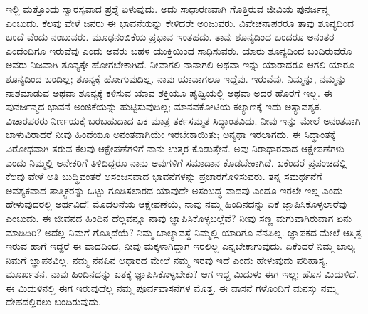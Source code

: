 ಇಲ್ಲಿ ಮತ್ತೊಂದು ಸ್ವಾರಸ್ಯವಾದ ಪ್ರಶ್ನೆ ಏಳುವುದು. ಅದು ಸಾಧಾರಣವಾಗಿ ಗೊತ್ತಿರುವ ಜೀವಿಯ ಪುನರ್ಜನ್ಮ ಎಂಬುದು. ಕೆಲವು ವೇಳೆ ಜನರು ಈ ಭಾವನೆಯನ್ನು ಕೇಳಿದರೇ ಅಂಜುವರು. ವಿವೇಚನಾಪರರೂ ತಾವು ಶೂನ್ಯದಿಂದ ಬಂದೆ ವೆಂದು ನಂಬುವರು. ಮೂಢನಂಬಿಕೆಯ ಪ್ರಭಾವ ಇಂತಹದು. ತಾವು ಶೂನ್ಯದಿಂದ ಬಂದರೂ ಅನಂತರ ಎಂದೆಂದಿಗೂ ಇರುವೆವು ಎಂದು ಅವರು ಬಹಳ ಯುಕ್ತಿಯಿಂದ ಸಾಧಿಸುವರು. ಯಾರು ಶೂನ್ಯದಿಂದ ಬಂದಿರುವರೊ ಅವರು ನಿಜವಾಗಿ ಶೂನ್ಯಕ್ಕೇ ಹೋಗಬೇಕಾಗಿದೆ. ನೀವಾಗಲಿ ನಾನಾಗಲಿ ಅಥವಾ ಇನ್ನು ಯಾರಾದರೂ ಆಗಲಿ ಯಾರೂ ಶೂನ್ಯದಿಂದ ಬಂದಿಲ್ಲ; ಶೂನ್ಯಕ್ಕೆ ಹೋಗುವುದಿಲ್ಲ. ನಾವು ಯಾವಾಗಲೂ ಇದ್ದೆವು. ಇರುವೆವು. ನಿಮ್ಮನ್ನು, ನಮ್ಮನ್ನು ನಾಶಮಾಡುವ ಅಥವಾ ಶೂನ್ಯಕ್ಕೆ ಕಳಿಸುವ ಯಾವ ಶಕ್ತಿಯೂ ಪೃಥ್ವಿಯಲ್ಲಿ ಅಥವಾ ಅದರ ಹೊರಗೆ ಇಲ್ಲ. ಈ ಪುನರ್ಜನ್ಮದ ಭಾವನೆ ಅಂಜಿಕೆಯನ್ನು ಹುಟ್ಟಿಸುವುದಿಲ್ಲ; ಮಾನವಕೋಟಿಯ ಕಲ್ಯಾಣಕ್ಕೆ ಇದು ಅತ್ಯಾವಶ್ಯಕ. ವಿಚಾರಪರರು ನಿರ್ಣಯಕ್ಕೆ ಬರಬಹುದಾದ ಏಕ ಮಾತ್ರ ತರ್ಕಸಮ್ಮತ ಸಿದ್ಧಾಂತವಿದು. ನೀವು ಇನ್ನು ಮೇಲೆ ಅನಂತವಾಗಿ ಬಾಳುವಿರಾದರೆ ನೀವು ಹಿಂದೆಯೂ ಅನಂತವಾಗಿಯೇ ಇರಬೇಕಾಯಿತು; ಅನ್ಯಥಾ ಇರಲಾಗದು. ಈ ಸಿದ್ಧಾಂತಕ್ಕೆ ವಿರೋಧವಾಗಿ ತರುವ ಕೆಲವು ಆಕ್ಷೇಪಣೆಗಳಿಗೆ ನಾನು ಉತ್ತರ ಕೊಡುತ್ತೇನೆ. ಅವು ನಿರಾಧಾರವಾದ ಆಕ್ಷೇಪಣೆಗಳು ಎಂದು ನಿಮ್ಮಲ್ಲಿ ಅನೇಕರಿಗೆ ತಿಳಿದಿದ್ದರೂ ನಾನು ಅವುಗಳಿಗೆ ಸಮಾದಾನ ಕೊಡಬೇಕಾಗಿದೆ. ಏಕೆಂದರೆ ಪ್ರಪಂಚದಲ್ಲಿ ಕೆಲವು ವೇಳೆ ಅತಿ ಬುದ್ಧಿವಂತರೆ ಅಸಂಜಸವಾದ ಭಾವನೆಗಳನ್ನು ಪ್ರಚಾರಗೊಳಿಸುವರು. ತನ್ನ ಸಮರ್ಥನೆಗೆ ಅವಶ್ಯಕವಾದ ತಾತ್ತ್ವಿಕರನ್ನು ಒಟ್ಟು ಗೂಡಿಸಲಾರದ ಯಾವುದೇ ಅಸಂಬದ್ಧ ವಾದವು ಎಂದೂ ಇರಲೇ ಇಲ್ಲ ಎಂದು ಹೇಳುವುದರಲ್ಲಿ ಅರ್ಥವಿದೆ! ಮೊದಲನೆಯ ಆಕ್ಷೇಪಣೆಯೆ, ನಾವು ನಮ್ಮ ಹಿಂದಿನದನ್ನು ಏಕೆ ಜ್ಞಾಪಿಸಿಕೊಳ್ಳಲಾರೆವು ಎಂಬುದು. ಈ ಜೀವನದ ಹಿಂದಿನ ದೆಲ್ಲವನ್ನೂ ನಾವು ಜ್ಞಾಪಿಸಿಕೊಳ್ಳಬಲ್ಲೆವೆ? ನೀವು ಸಣ್ಣ ಮಗುವಾಗಿರುವಾಗ ಏನು ಮಾಡಿದಿರಿ? ಅದೆಲ್ಲ ನಿಮಗೆ ಗೊತ್ತಿದೆಯೆ? ನಿಮ್ಮ ಬಾಲ್ಯಾವಸ್ಥೆ ನಿಮ್ಮಲ್ಲಿ ಯಾರಿಗೂ ನೆನಪಿಲ್ಲ. ಜ್ಞಾಪಕದ ಮೇಲೆ ಆಸ್ತಿತ್ವ ಇರುವ ಹಾಗೆ ಇದ್ದರೆ ಈ ವಾದದಿಂದ, ನೀವು ಮಕ್ಕಳಾಗಿದ್ದಾಗ ಇರಲಿಲ್ಲ ಎನ್ನಬೇಕಾಗುವುದು. ಏಕೆಂದರೆ ನಿಮ್ಮ ಬಾಲ್ಯ ನಿಮಗೆ ಜ್ಞಾಪಕವಿಲ್ಲ. ನಮ್ಮ ನೆನಪಿನ ಆಧಾರದ ಮೇಲೆ ನಮ್ಮ ಇರವು ಇದೆ ಎಂದು ಹೇಳುವುದು ಪರಿಹಾಸ್ಯ, ಮೂರ್ಖತನ. ನಾವು ಹಿಂದಿನದನ್ನು ಏತಕ್ಕೆ ಜ್ಞಾಪಿಸಿಕೊಳ್ಳಬೇಕು? ಆಗ ಇದ್ದ ಮಿದುಳು ಈಗ ಇಲ್ಲ; ಹೊಸ ಮಿದುಳಿದೆ. ಈ ಮಿದುಳಿನಲ್ಲಿ ಈಗ ಇರುವುದೆಲ್ಲ ನಮ್ಮ ಪೂರ್ವವಾಸನೆಗಳ ಮೊತ್ತ. ಈ ವಾಸನೆ ಗಳೊಂದಿಗೆ ಮನಸ್ಸು ನಮ್ಮ ದೇಹದಲ್ಲಿರಲು ಬಂದಿರುವುದು.

